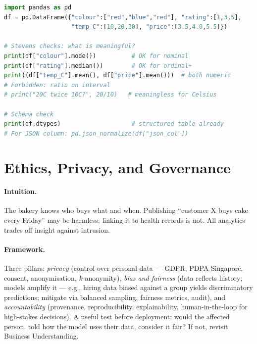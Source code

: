 \begin{lstlisting}[language=Python, caption={Classifying columns before modelling avoids illegal operations.}, label={lst:types}]
import pandas as pd
df = pd.DataFrame({"colour":["red","blue","red"], "rating":[1,3,5],
                   "temp_C":[10,20,30], "price":[3.5,4.0,5.5]})

# Stevens checks: what is meaningful?
print(df["colour"].mode())          # OK for nominal
print(df["rating"].median())        # OK for ordinal+
print((df["temp_C"].mean(), df["price"].mean()))  # both numeric
# Forbidden: ratio on interval
# print("20C twice 10C?", 20/10)   # meaningless for Celsius

# Schema check
print(df.dtypes)                    # structured table already
# For JSON column: pd.json_normalize(df["json_col"])
\end{lstlisting}

\section{Ethics, Privacy, and Governance}
\label{sec:ethics}
\paragraph{Intuition.} The bakery knows who buys what and when. Publishing ``customer X buys cake every Friday'' may be harmless; linking it to health records is not. All analytics trades off insight against intrusion.

\paragraph{Framework.} Three pillars: \emph{privacy} (control over personal data --- GDPR, PDPA Singapore, consent, anonymisation, $k$-anonymity), \emph{bias and fairness} (data reflects history; models amplify it --- e.g., hiring data biased against a group yields discriminatory predictions; mitigate via balanced sampling, fairness metrics, audit), and \emph{accountability} (provenance, reproducibility, explainability, human-in-the-loop for high-stakes decisions). A useful test before deployment: would the affected person, told how the model uses their data, consider it fair? If not, revisit Business Understanding.

